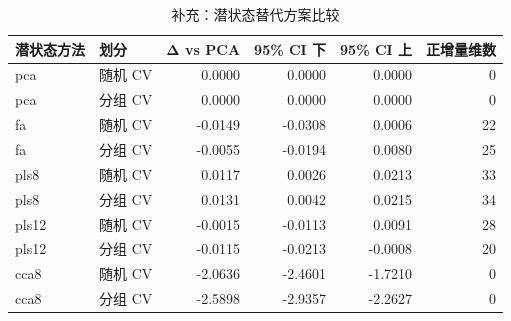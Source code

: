\begin{table}[tbp]
\centering
\caption{补充：潜状态替代方案比较}
\label{tab:s06_q1_latent}
\footnotesize
\setlength{\tabcolsep}{3.5pt}
\begin{tabular}{llrrrr}
\toprule
潜状态方法 & 划分 & Δ vs PCA & 95\% CI 下 & 95\% CI 上 & 正增量维数 \\
\midrule
pca & 随机 CV & 0.0000 & 0.0000 & 0.0000 & 0 \\
pca & 分组 CV & 0.0000 & 0.0000 & 0.0000 & 0 \\
fa & 随机 CV & -0.0149 & -0.0308 & 0.0006 & 22 \\
fa & 分组 CV & -0.0055 & -0.0194 & 0.0080 & 25 \\
pls8 & 随机 CV & 0.0117 & 0.0026 & 0.0213 & 33 \\
pls8 & 分组 CV & 0.0131 & 0.0042 & 0.0215 & 34 \\
pls12 & 随机 CV & -0.0015 & -0.0113 & 0.0091 & 28 \\
pls12 & 分组 CV & -0.0115 & -0.0213 & -0.0008 & 20 \\
cca8 & 随机 CV & -2.0636 & -2.4601 & -1.7210 & 0 \\
cca8 & 分组 CV & -2.5898 & -2.9357 & -2.2627 & 0 \\
\bottomrule
\end{tabular}
\end{table}
